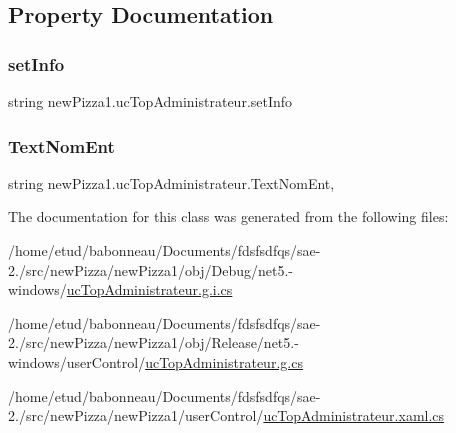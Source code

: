 \subsection{Property Documentation}
\mbox{\label{classnewPizza1_1_1ucTopAdministrateur_ac0ce93514c9cc7e562df72033c6a0bb4}} 
\subsubsection{\texorpdfstring{set\+Info}{setInfo}}
{\footnotesize\ttfamily string new\+Pizza1.\+uc\+Top\+Administrateur.\+set\+Info\hspace{0.3cm}{\ttfamily [set]}}

\mbox{\label{classnewPizza1_1_1ucTopAdministrateur_a37289b547deb5667fe983399693d4bdb}} 
\subsubsection{\texorpdfstring{Text\+Nom\+Ent}{TextNomEnt}}
{\footnotesize\ttfamily string new\+Pizza1.\+uc\+Top\+Administrateur.\+Text\+Nom\+Ent\hspace{0.3cm}{\ttfamily [get]}, {\ttfamily [set]}}



The documentation for this class was generated from the following files\+:\begin{DoxyCompactItemize}
\item 
/home/etud/babonneau/\+Documents/fdsfsdfqs/sae-\/2./src/new\+Pizza/new\+Pizza1/obj/\+Debug/net5.-\/windows/\hyperlink{net5_80-windows_2ucTopAdministrateur_8g_8i_8cs}{uc\+Top\+Administrateur.\+g.\+i.\+cs}\item 
/home/etud/babonneau/\+Documents/fdsfsdfqs/sae-\/2./src/new\+Pizza/new\+Pizza1/obj/\+Release/net5.-\/windows/user\+Control/\hyperlink{ucTopAdministrateur_8g_8cs}{uc\+Top\+Administrateur.\+g.\+cs}\item 
/home/etud/babonneau/\+Documents/fdsfsdfqs/sae-\/2./src/new\+Pizza/new\+Pizza1/user\+Control/\hyperlink{ucTopAdministrateur_8xaml_8cs}{uc\+Top\+Administrateur.\+xaml.\+cs}\end{DoxyCompactItemize}
